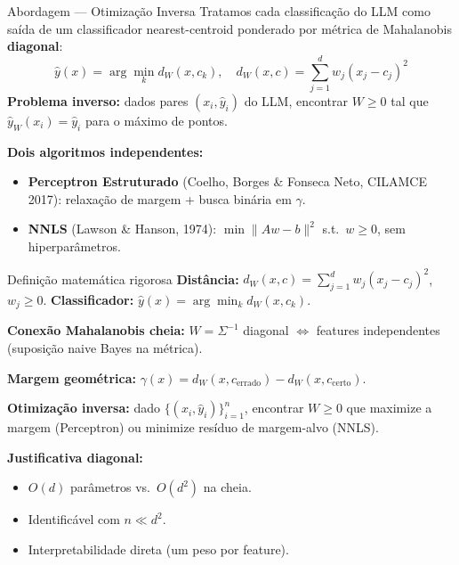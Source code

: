 \documentclass[aspectratio=169,10pt]{beamer}
\begin{document}
\begin{frame}{Abordagem --- Otimiza\c{c}\~ao Inversa}
  \footnotesize
  Tratamos cada classifica\c{c}\~ao do LLM como sa\'ida de um classificador nearest-centroid ponderado por m\'etrica de Mahalanobis \textbf{diagonal}:
  \[ \hat y(x) = \arg\min_k d_W(x, c_k), \quad d_W(x,c) = \sum_{j=1}^{d} w_j (x_j - c_j)^2 \]
  \textbf{Problema inverso:} dados pares $(x_i, \hat y_i)$ do LLM, encontrar $W \geq 0$ tal que $\hat y_W(x_i)=\hat y_i$ para o m\'aximo de pontos.
  \medskip

  \textbf{Dois algoritmos independentes:}
  \begin{itemize}
    \item \textbf{Perceptron Estruturado} (Coelho, Borges \& Fonseca Neto, CILAMCE 2017): relaxa\c{c}\~ao de margem + busca bin\'aria em $\gamma$.
    \item \textbf{NNLS} (Lawson \& Hanson, 1974): $\min \|Aw-b\|^2$ s.t.\ $w \geq 0$, sem hiperpar\^ametros.
  \end{itemize}
\end{frame}

\begin{frame}{Defini\c{c}\~ao matem\'atica rigorosa}
  \scriptsize
  \textbf{Dist\^ancia:} $d_W(x, c) = \sum_{j=1}^{d} w_j (x_j - c_j)^2$, $w_j \geq 0$.\quad
  \textbf{Classificador:} $\hat y(x) = \arg\min_k d_W(x, c_k)$.
  \medskip

  \textbf{Conex\~ao Mahalanobis cheia:} $W = \Sigma^{-1}$ diagonal $\Leftrightarrow$ features independentes (suposi\c{c}\~ao naive Bayes na m\'etrica).
  \medskip

  \textbf{Margem geom\'etrica:} $\gamma(x) = d_W(x, c_{\text{errado}}) - d_W(x, c_{\text{certo}})$.
  \medskip

  \textbf{Otimiza\c{c}\~ao inversa:} dado $\{(x_i, \hat y_i)\}_{i=1}^n$, encontrar $W \geq 0$ que maximize a margem (Perceptron) ou minimize res\'iduo de margem-alvo (NNLS).
  \medskip

  \textbf{Justificativa diagonal:}
  \begin{itemize}
    \item $O(d)$ par\^ametros vs.\ $O(d^2)$ na cheia.
    \item Identific\'avel com $n \ll d^2$.
    \item Interpretabilidade direta (um peso por feature).
  \end{itemize}
\end{frame}
\end{document}
